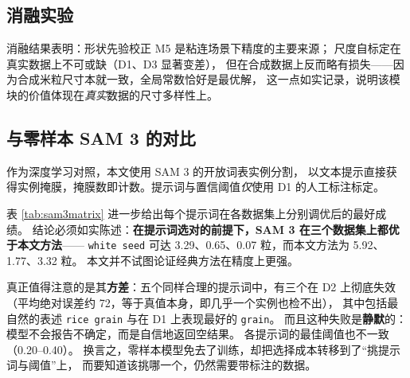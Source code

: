 \documentclass[12pt, a4paper]{ctexart}
\begin{document}
\subsection{消融实验}

\begin{table}[H]
  \centering
  \caption{消融实验（平均绝对误差，越小越好）。}
  \label{tab:ablation}
  \small
  
\end{table}

\begin{table}[H]
  \centering
  \caption{h-maxima 抑制深度系数 $\beta$ 的敏感性。}
  \label{tab:beta}
  \small
  
\end{table}

消融结果表明：形状先验校正 M5 是粘连场景下精度的主要来源；
尺度自标定在真实数据上不可或缺（D1、D3 显著变差），
但在合成数据上反而略有损失——因为合成米粒尺寸本就一致，全局常数恰好是最优解，
这一点如实记录，说明该模块的价值体现在\emph{真实}数据的尺寸多样性上。

\subsection{与零样本 SAM 3 的对比}
\label{sec:sam3}

作为深度学习对照，本文使用 SAM 3\cite{sam3} 的开放词表实例分割，
以文本提示直接获得实例掩膜，掩膜数即计数。提示词与置信阈值\emph{仅}使用 D1 的人工标注标定。

\begin{table}[H]
  \centering
  \caption{SAM 3 在 D1 上的提示词与阈值标定（平均绝对误差）。}
  \label{tab:sam3}
  \small
  
\end{table}

表 \ref{tab:sam3matrix} 进一步给出每个提示词在各数据集上分别调优后的最好成绩。
结论必须如实陈述：\textbf{在提示词选对的前提下，SAM 3 在三个数据集上都优于本文方法}——
\texttt{white seed} 可达 3.29、0.65、0.07 粒，而本文方法为 5.92、1.77、3.32 粒。
本文并不试图论证经典方法在精度上更强。

\begin{table}[H]
  \centering
  \caption{SAM 3 各提示词在每个数据集上单独调优后的最好平均绝对误差，
  $\tau^\ast$ 为对应的最佳置信阈值。D3 为前 200 张的子集。}
  \label{tab:sam3matrix}
  \small
  
\end{table}

真正值得注意的是其\textbf{方差}：五个同样合理的提示词中，有三个在 D2 上彻底失效
（平均绝对误差约 72，等于真值本身，即几乎一个实例也检不出），
其中包括最自然的表述 \texttt{rice grain} 与在 D1 上表现最好的 \texttt{grain}。
而且这种失败是\textbf{静默}的：模型不会报告不确定，而是自信地返回空结果。
各提示词的最佳阈值也不一致（0.20--0.40）。
换言之，零样本模型免去了训练，却把选择成本转移到了“挑提示词与阈值”上，
而要知道该挑哪一个，仍然需要带标注的数据。
\end{document}
